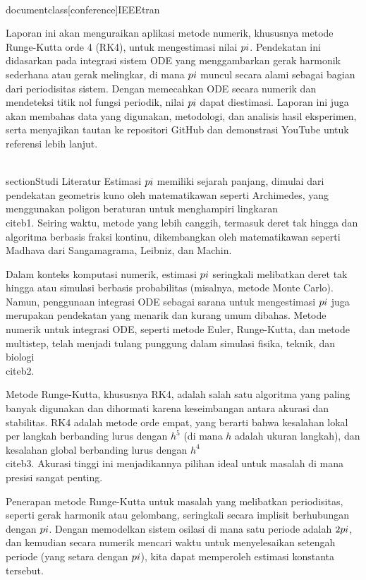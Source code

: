\\documentclass[conference]{IEEEtran}
\begin{document}
Laporan ini akan menguraikan aplikasi metode numerik, khususnya metode Runge-Kutta orde 4 (RK4), untuk mengestimasi nilai $\\pi$. Pendekatan ini didasarkan pada integrasi sistem ODE yang menggambarkan gerak harmonik sederhana atau gerak melingkar, di mana $\\pi$ muncul secara alami sebagai bagian dari periodisitas sistem. Dengan memecahkan ODE secara numerik dan mendeteksi titik nol fungsi periodik, nilai $\\pi$ dapat diestimasi. Laporan ini juga akan membahas data yang digunakan, metodologi, dan analisis hasil eksperimen, serta menyajikan tautan ke repositori GitHub dan demonstrasi YouTube untuk referensi lebih lanjut.

\\section{Studi Literatur}
Estimasi $\\pi$ memiliki sejarah panjang, dimulai dari pendekatan geometris kuno oleh matematikawan seperti Archimedes, yang menggunakan poligon beraturan untuk menghampiri lingkaran \\cite{b1}. Seiring waktu, metode yang lebih canggih, termasuk deret tak hingga dan algoritma berbasis fraksi kontinu, dikembangkan oleh matematikawan seperti Madhava dari Sangamagrama, Leibniz, dan Machin.

Dalam konteks komputasi numerik, estimasi $\\pi$ seringkali melibatkan deret tak hingga atau simulasi berbasis probabilitas (misalnya, metode Monte Carlo). Namun, penggunaan integrasi ODE sebagai sarana untuk mengestimasi $\\pi$ juga merupakan pendekatan yang menarik dan kurang umum dibahas. Metode numerik untuk integrasi ODE, seperti metode Euler, Runge-Kutta, dan metode multistep, telah menjadi tulang punggung dalam simulasi fisika, teknik, dan biologi \\cite{b2}.

Metode Runge-Kutta, khususnya RK4, adalah salah satu algoritma yang paling banyak digunakan dan dihormati karena keseimbangan antara akurasi dan stabilitas. RK4 adalah metode orde empat, yang berarti bahwa kesalahan lokal per langkah berbanding lurus dengan $h^5$ (di mana $h$ adalah ukuran langkah), dan kesalahan global berbanding lurus dengan $h^4$ \\cite{b3}. Akurasi tinggi ini menjadikannya pilihan ideal untuk masalah di mana presisi sangat penting.

Penerapan metode Runge-Kutta untuk masalah yang melibatkan periodisitas, seperti gerak harmonik atau gelombang, seringkali secara implisit berhubungan dengan $\\pi$. Dengan memodelkan sistem osilasi di mana satu periode adalah $2\\pi$, dan kemudian secara numerik mencari waktu untuk menyelesaikan setengah periode (yang setara dengan $\\pi$), kita dapat memperoleh estimasi konstanta tersebut.
\end{document}

